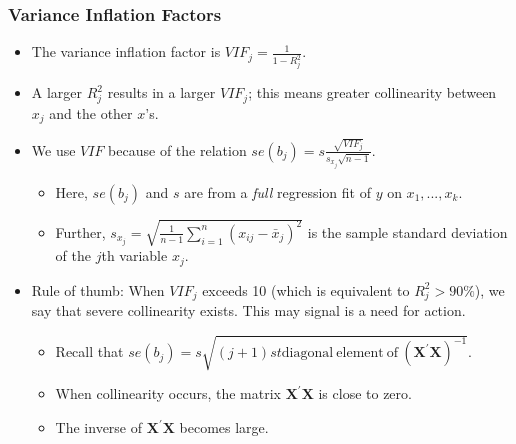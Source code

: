 \begin{frame}[shrink=2]
 \frametitle{Variance Inflation Factors}
 \begin{itemize}
\item The variance inflation factor is $ VIF_{j}=\frac{1}{1-R_{j}^{2}}. $
\item A larger $R_j^2$ results in a larger $VIF_{j}$; this means greater
collinearity between $x_{j}$ and the other $x$'s.
\item We use $VIF$ because of the relation
$ se(b_{j}) = s \frac{\sqrt{VIF_{j}}}{s_{x_{j}}\sqrt{n-1}}. $
 \begin{itemize}
\item Here, $se(b_{j})$ and $s$ are from a \emph{full} regression fit of
$y$ on $x_{1},...,x_{k}$.
\item Further, $s_{x_j} = \sqrt{\frac{1}{n-1}
\sum_{i=1}^{n}(x_{ij}-\bar{x}_{j})^{2} }$ is the sample standard
deviation of the $j$th variable $x_{j}$.
   \end{itemize}
\item Rule of thumb: When
$VIF_{j}$ exceeds 10 (which is equivalent to $R_{j}^{2}>90\%$), we
say that severe collinearity exists. This may signal is a need for
action.
 \begin{itemize}
\item Recall that $se(b_{j}) = s \sqrt{(j+1)st
\mathrm{diagonal~element~ of~} (\mathbf{X^{\prime} X})^{-1}}$.
\item When collinearity occurs, the matrix
$\mathbf{X^{\prime}X}$ is close to zero.
\item The inverse of $\mathbf{X^{\prime} X}$ becomes large.
    \end{itemize}
    \end{itemize}
\end{frame}



